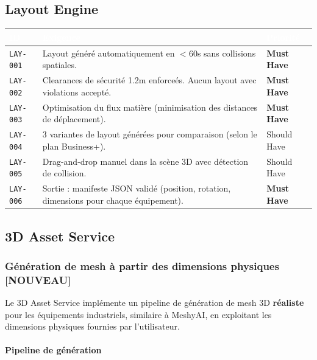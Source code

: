 \documentclass[12pt,a4paper]{article}
\newcommand{\req}[1]{\texttt{\textcolor{daedalusblue}{#1}}}
\newcommand{\NEW}{\textcolor{daedalusgold}{\textbf{[NOUVEAU]}}}
\newcommand{\musthave}{\cellcolor{musthave}\textbf{Must Have}}
\newcommand{\shouldhave}{\cellcolor{shouldhave}Should Have}
\begin{document}
\subsection{Layout Engine}

\begin{tabularx}{\textwidth}{|l|X|l|}
\hline
\rowcolor{tablehead}\textcolor{white}{\textbf{ID}} & \textcolor{white}{\textbf{Exigence}} & \textcolor{white}{\textbf{Priorité}} \\
\hline
\req{LAY-001} & Layout généré automatiquement en $< 60$s sans collisions spatiales. & \musthave \\
\hline
\req{LAY-002} & Clearances de sécurité 1.2m enforceés. Aucun layout avec violations accepté. & \musthave \\
\hline
\req{LAY-003} & Optimisation du flux matière (minimisation des distances de déplacement). & \musthave \\
\hline
\req{LAY-004} & 3 variantes de layout générées pour comparaison (selon le plan Business+). & \shouldhave \\
\hline
\req{LAY-005} & Drag-and-drop manuel dans la scène 3D avec détection de collision. & \shouldhave \\
\hline
\req{LAY-006} & Sortie : manifeste JSON validé (position, rotation, dimensions pour chaque équipement). & \musthave \\
\hline
\end{tabularx}

\subsection{3D Asset Service}

\subsubsection{Génération de mesh à partir des dimensions physiques \NEW}

Le 3D Asset Service implémente un pipeline de génération de mesh 3D \textbf{réaliste} pour les équipements industriels, similaire à MeshyAI, en exploitant les dimensions physiques fournies par l'utilisateur.

\paragraph{Pipeline de génération}
\end{document}

